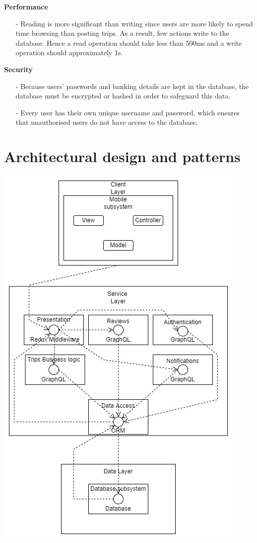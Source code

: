 \documentclass[hidelinks, 12pt, a4paper]{article}
\begin{document}
\vspace{0.5cm}
\large{ \textbf{Performance}}
\begin{itemize}
      \item[-] Reading is more significant than writing since users are more likely to spend time browsing than posting trips. As a result, few actions write to the database. Hence a read operation should take less than 500ms and a write operation should approximately 1s.
\end{itemize}
\vspace{0.5cm}
\large{ \textbf{Security}}
\begin{itemize}
      \item [-] Because users' passwords and banking details  are kept in the database, the database must be encrypted or hashed in order to safeguard this data.
      \item [-] Every user has their own unique username and password, which ensures that unauthorised users do not have access to the database.
\end{itemize}


\section{Architectural design and patterns}
\begin{center}
    \noindent
    \includegraphics[]{images/Archn.png}
    \vspace{0.5cm}
\end{center}
\end{document}
